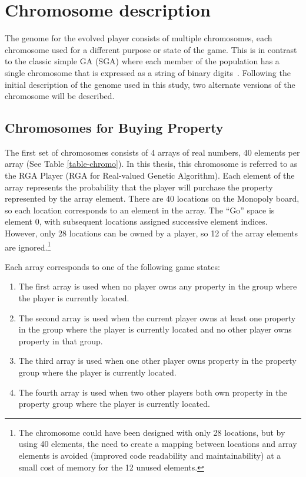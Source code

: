 \section{Chromosome description} \label{5_chromo}

The genome for the evolved player consists of multiple chromosomes, each
chromosome used for a different purpose or state of the game. This is in
contrast to the classic simple GA (SGA) where each member of the population has
a single chromosome that is expressed as a string of binary
digits~\cite{haupt2004practical}. Following the initial description of the
genome used in this study, two alternate versions of the chromosome will be
described.

\subsection{Chromosomes for Buying Property}

The first set of chromosomes consists of 4 arrays of real numbers, 40 elements
per array (See Table \ref{table-chromo}). In this thesis, this chromosome is
referred to as the RGA Player (RGA for Real-valued Genetic Algorithm). Each
element of the array represents the probability that the player will purchase
the property represented by the array element. There are 40 locations on the
Monopoly board, so each location corresponds to an element in the array. The
``Go'' space is element 0, with subsequent locations assigned successive element
indices. However, only 28 locations can be owned by a player, so 12 of the array
elements are ignored.\footnote{The chromosome could have been designed with
only 28 locations, but by using 40 elements, the need to create a mapping
between locations and array elements is avoided (improved code readability and
maintainability) at a small cost of memory for the 12 unused elements.}

Each array corresponds to one of the following game states:

\begin{enumerate}
  \item{The first array is used when no player owns any property in the group
  where the player is currently located.}
  \item{The second array is used when the current player owns at least one
  property in the group where the player is currently located and no other
  player owns property in that group.}
  \item{The third array is used when one other player owns property in the
  property group where the player is currently located.}
  \item{The fourth array is used when two other players both own property in the
  property group where the player is currently located.}
\end{enumerate}

